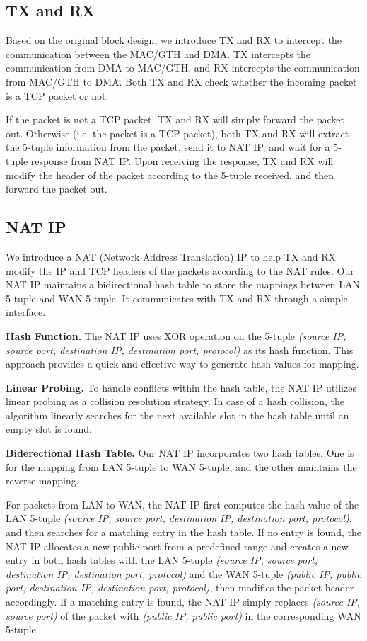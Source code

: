 \subsection{TX and RX}

    Based on the original block design, we introduce TX and RX to intercept the communication between the MAC/GTH and DMA. TX intercepts the communication from DMA to MAC/GTH, and RX intercepts the communication from MAC/GTH to DMA. Both TX and RX check whether the incoming packet is a TCP packet or not. 
    
    If the packet is not a TCP packet, TX and RX will simply forward the packet out. Otherwise (i.e. the packet is a TCP packet), both TX and RX will extract the 5-tuple information from the packet, send it to NAT IP, and wait for a 5-tuple response from NAT IP. Upon receiving the response, TX and RX will modify the header of the packet according to the 5-tuple received, and then forward the packet out.

\subsection{NAT IP}

    We introduce a NAT (Network Address Translation) IP to help TX and RX modify the IP and TCP headers of the packets according to the NAT rules. Our NAT IP maintains a bidirectional hash table to store the mappings between LAN 5-tuple and WAN 5-tuple. It communicates with TX and RX through a simple interface. 

    \textbf{Hash Function.} The NAT IP uses XOR operation on the 5-tuple \emph{(source IP, source port, destination IP, destination port, protocol)} as its hash function. This approach provides a quick and effective way to generate hash values for mapping.

    \textbf{Linear Probing.} To handle conflicts within the hash table, the NAT IP utilizes linear probing as a collision resolution strategy. In case of a hash collision, the algorithm linearly searches for the next available slot in the hash table until an empty slot is found.

    \textbf{Biderectional Hash Table.} Our NAT IP incorporates two hash tables. One is for the mapping from LAN 5-tuple to WAN 5-tuple, and the other maintains the reverse mapping.

    For packets from LAN to WAN, the NAT IP first computes the hash value of the LAN 5-tuple \emph{(source IP, source port, destination IP, destination port, protocol)}, and then searches for a matching entry in the hash table. If no entry is found, the NAT IP allocates a new public port from a predefined range and creates a new entry in both hash tables with the LAN 5-tuple \emph{(source IP, source port, destination IP, destination port, protocol)} and the WAN 5-tuple \emph{(public IP, public port, destination IP, destination port, protocol)}, then modifies the packet header accordingly. If a matching entry is found, the NAT IP simply replaces \emph{(source IP,  source port)} of the packet with \emph{(public IP, public port)} in the corresponding WAN 5-tuple.

